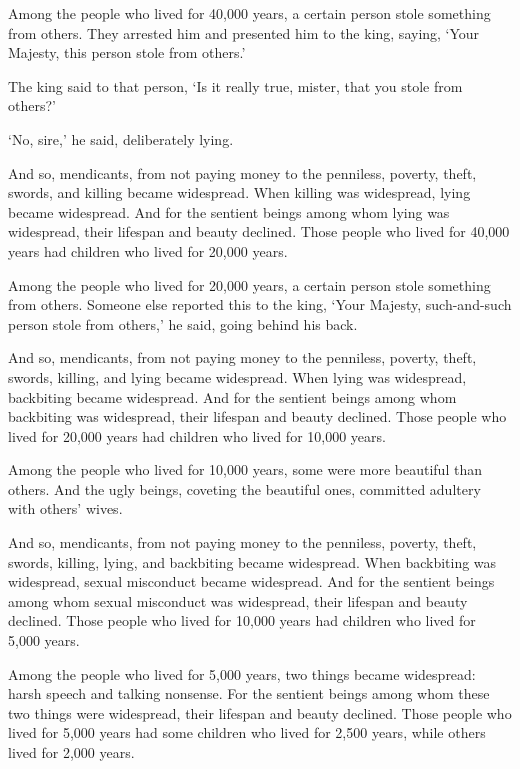 \documentclass[12pt,openany]{book}%
\begin{document}
Among the people who lived for 40,000 years, a certain person stole something from others. They arrested him and presented him to the king, saying, ‘Your Majesty, this person stole from others.’ 

The king said to that person, ‘Is it really true, mister, that you stole from others?’ 

‘No, sire,’ he said, deliberately lying. 

And so, mendicants, from not paying money to the penniless, poverty, theft, swords, and killing became widespread. When killing was widespread, lying became widespread. And for the sentient beings among whom lying was widespread, their lifespan and beauty declined. Those people who lived for 40,000 years had children who lived for 20,000 years. 

Among the people who lived for 20,000 years, a certain person stole something from others. Someone else reported this to the king, ‘Your Majesty, such-and-such person stole from others,’ he said, going behind his back. 

And so, mendicants, from not paying money to the penniless, poverty, theft, swords, killing, and lying became widespread. When lying was widespread, backbiting became widespread. And for the sentient beings among whom backbiting was widespread, their lifespan and beauty declined. Those people who lived for 20,000 years had children who lived for 10,000 years. 

Among the people who lived for 10,000 years, some were more beautiful than others. And the ugly beings, coveting the beautiful ones, committed adultery with others’ wives. 

And so, mendicants, from not paying money to the penniless, poverty, theft, swords, killing, lying, and backbiting became widespread. When backbiting was widespread, sexual misconduct became widespread. And for the sentient beings among whom sexual misconduct was widespread, their lifespan and beauty declined. Those people who lived for 10,000 years had children who lived for 5,000 years. 

Among the people who lived for 5,000 years, two things became widespread: harsh speech and talking nonsense. For the sentient beings among whom these two things were widespread, their lifespan and beauty declined. Those people who lived for 5,000 years had some children who lived for 2,500 years, while others lived for 2,000 years. 
\end{document}
